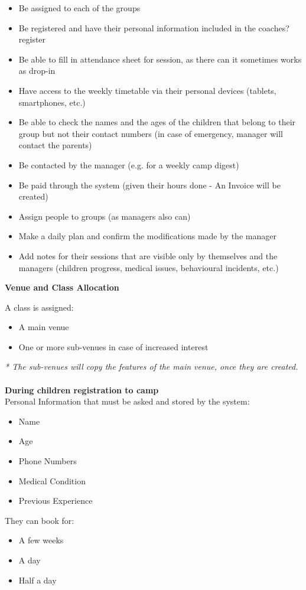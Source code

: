 \documentclass{l3proj}
\begin{document}
	\begin{itemize}
	\item Be assigned to each of the groups
	\item Be registered and have their personal information included in the coaches? register
	\item Be able to fill in attendance sheet for session, as there can it sometimes works as drop-in
	\item Have access to the weekly timetable via their personal devices (tablets, smartphones, etc.)
	\item Be able to check the names and the ages of the children that belong to their group but not their contact numbers (in case of emergency, manager will contact the parents)
	\item Be contacted by the manager (e.g. for a weekly camp digest)
	\item Be paid through the system (given their hours done - An Invoice will be created)
	\item Assign people to groups (as managers also can)
	\item Make a daily plan and confirm the modifications made by the manager
	\item Add notes for their sessions that are visible only by themselves and the managers (children progress, medical issues, behavioural incidents, etc.)
	\end{itemize}
\textbf{\Large{Venue and Class Allocation}}
\par
A class is assigned:
	\begin{itemize}
	\item A main venue
	\item One or more sub-venues in case of increased interest
	\end{itemize}
\emph{* The sub-venues will copy the features of the main venue, once they are created.}\\
\\
\textbf{During children registration to camp}\\
Personal Information that must be asked and stored by the system:
	\begin{itemize}
	\item Name
	\item Age
	\item Phone Numbers
	\item Medical Condition
	\item Previous Experience
	\end{itemize}
They can book for:
	\begin{itemize}
	\item A few weeks
	\item A day
	\item Half a day
	\end{itemize}
\end{document}
